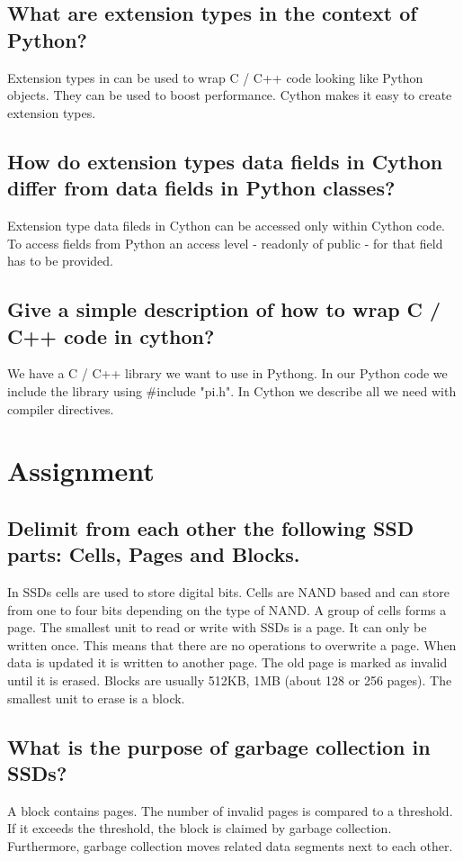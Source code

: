 \documentclass[runningheads]{llncs}
\begin{document}
\subsection{What are extension types in the context of Python?}
Extension types in can be used to wrap C / C++ code looking like Python objects.
They can be used to boost performance. Cython makes it easy to create extension types.

\subsection{How do extension types data fields in Cython differ from data fields in Python classes?}
Extension type data fileds in Cython can be accessed only within Cython code.
To access fields from Python an access level - readonly of public - for that field has to be provided.

\subsection{Give a simple description of how to wrap C / C++ code in cython?}
We have a C / C++ library we want to use in Pythong. 
In our Python code we include the library using \#include "pi.h".
In Cython we describe all we need with compiler directives.


\section{Assignment}

\subsection{Delimit from each other the following SSD parts: Cells, Pages and Blocks.}
In SSDs cells are used to store digital bits. 
Cells are NAND based and can store from one to four bits depending on the type of NAND.
A group of cells forms a page. The smallest unit to read or write with SSDs is a page.
It can only be written once. This means that there are no operations to overwrite a page.
When data is updated it is written to another page. 
The old page is marked as invalid until it is erased.
Blocks are usually 512KB, 1MB (about 128 or 256 pages). The smallest unit to erase is a block.

\subsection{What is the purpose of garbage collection in SSDs?}
A block contains pages. The number of invalid pages is compared to a threshold. 
If it exceeds the threshold, the block is claimed by garbage collection.
Furthermore, garbage collection moves related data segments next to each other.
\end{document}
